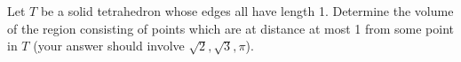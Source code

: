 Let $T$ be a solid tetrahedron whose edges all have length 1. Determine the
volume of the region consisting of points which are at distance at most 1 from
some point in $T$ (your answer should involve $\sqrt{2}, \sqrt{3}, \pi$).
